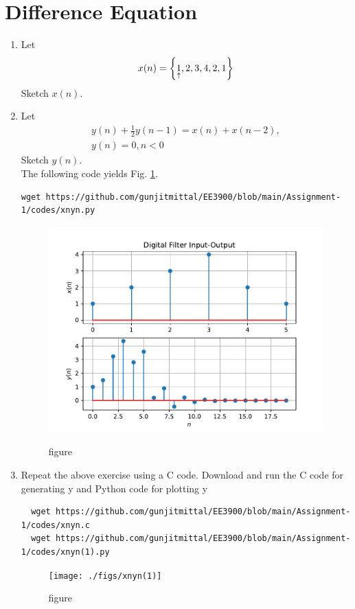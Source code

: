 \documentclass[journal,12pt,twocolumn]{IEEEtran}
\renewcommand\thesection{\arabic{section}}
\begin{document}
\section{Difference Equation}
\begin{enumerate}[label=\thesection.\arabic*,ref=\thesection.\theenumi]
\item Let
\label{def:xn}
\begin{equation}
x(n) = \left\{\underset{\uparrow}{1},2,3,4,2,1\right\}
\end{equation}
Sketch $x(n)$.
\item Let
\begin{multline}
\label{eq:iir_filter}
y(n) + \frac{1}{2}y(n-1) = x(n) + x(n-2), 
\\
 y(n) = 0, n < 0
\end{multline}
Sketch $y(n)$.
\\
\solution The following code yields Fig. \ref{fig:xnyn}.
\begin{lstlisting}
wget https://github.com/gunjitmittal/EE3900/blob/main/Assignment-1/codes/xnyn.py
\end{lstlisting}
\begin{figure}[!ht]
\begin{center}
\includegraphics[width=\columnwidth]{./figs/xnyn}
\end{center}
\caption{figure}{}
\label{fig:xnyn}	
\end{figure}
\item Repeat the above exercise using a C code.
\solution
Download and run the C code for generating y and Python code for plotting y
\begin{lstlisting}
  wget https://github.com/gunjitmittal/EE3900/blob/main/Assignment-1/codes/xnyn.c
  wget https://github.com/gunjitmittal/EE3900/blob/main/Assignment-1/codes/xnyn(1).py
  \end{lstlisting}
  \begin{figure}[!ht]
    \begin{center}
    \texttt{[image: ./figs/xnyn(1)]}
    \end{center}
    \caption{figure}{}
    \label{fig:xnyn(1)}	
    \end{figure}
\end{enumerate}
\end{document}

